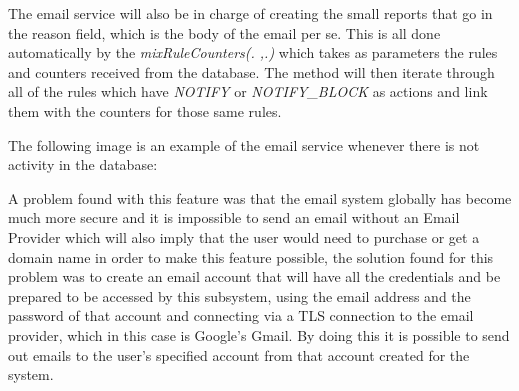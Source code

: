 The email service will also be in charge of creating the small reports that go
in the reason field, which is the body of the email per se. This is all done
automatically by the \emph{mixRuleCounters(. ,.)} which takes as parameters the
rules and counters received from the database. The method will then iterate
through all of the rules which have \emph{NOTIFY} or \emph{NOTIFY\_BLOCK} as
actions and link them with the counters for those same rules.

The following image is an example of the email service whenever there is not
activity in the database:


A problem found with this feature was that the email system globally has become
much more secure and it is impossible to send an email without an Email Provider
which will also imply that the user would need to purchase or get a domain name
in order to make this feature possible, the solution found for this problem was
to create an email account that will have all the credentials and be prepared to
be accessed by this subsystem, using the email address and the password of that
account and connecting via a TLS connection to the email provider, which in this
case is Google's Gmail. By doing this it is possible to send out emails to the
user's specified account from that account created for the system.

